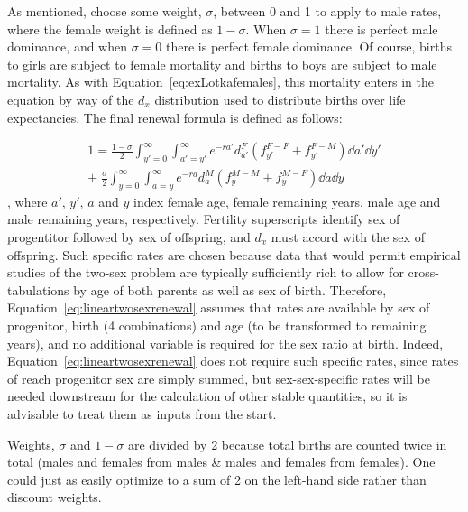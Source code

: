  \FloatBarrier
\label{sec:2sexlinearmain}
As mentioned, choose some weight, $\sigma$, between 0 and 1 to apply to male
rates, where the female weight is defined as $1 - \sigma$. When $\sigma = 1$
there is perfect male dominance, and when $\sigma = 0$ there is perfect female
dominance. Of course, births to girls are subject to female mortality and births
to boys are subject to male mortality. As with
Equation~\eqref{eq:exLotkafemales}, this mortality enters in the equation by way
of the $d_x$ distribution used to distribute births over life expectancies. The
final renewal formula is defined as follows:

\begin{equation}
\label{eq:lineartwosexrenewal}
\begin{split}
1 = \frac{1 - \sigma}{2} 
            \int _{y'=0}^\infty \int _{a'=y'}^\infty e^{-ra'}
                      d_{a'}^F \left(f_{y'}^{F-F} + f_{y'}^{F-M}\right) \dd a'
                      \dd y' \\ + \;\frac{\sigma}{2}
            \int _{y=0}^\infty \int _{a=y}^\infty e^{-ra}
                      d_{a}^M  \left(f_{y}^{M-M} + f_{y}^{M-F}\right)\dd a \dd y
\end{split}
\end{equation}
, where $a'$, $y'$, $a$ and $y$ index female age, female remaining years, male
age and male remaining years, respectively. Fertility superscripts identify sex of
progentitor followed by sex of offspring, and $d_x$ must accord with the sex of
offspring. Such specific rates are chosen because data that would permit
empirical studies of the two-sex problem are typically sufficiently rich to allow 
for cross-tabulations by age of both parents as well as sex of birth. 
Therefore, Equation~\eqref{eq:lineartwosexrenewal} assumes that rates are
available by sex of progenitor, birth (4 combinations) and age (to be transformed to remaining years), 
and no additional variable is required for the sex ratio at birth. Indeed,
Equation~\ref{eq:lineartwosexrenewal} does not require such specific rates,
since rates of reach progenitor sex are simply summed, but sex-sex-specific
rates will be needed downstream for the calculation of other stable quantities,
so it is advisable to treat them as inputs from the start.

Weights, $\sigma$ and $1-\sigma$ are divided by 2 because
total births are counted twice in total (males and females from males \&
males and females from females). One could just as easily optimize to a sum of
2 on the left-hand side rather than discount weights.

